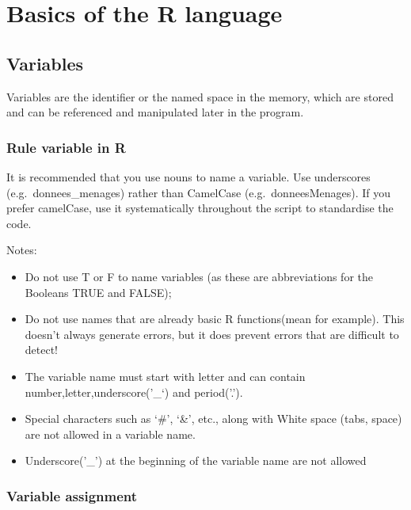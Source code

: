 \documentclass[
]{book}
\providecommand{\tightlist}{%
  \setlength{\itemsep}{0pt}\setlength{\parskip}{0pt}}
\begin{document}
\hypertarget{basics-of-the-r-language}{%
\chapter{Basics of the R language}\label{basics-of-the-r-language}}

\hypertarget{variables}{%
\section{Variables}\label{variables}}

Variables are the identifier or the named space in the memory, which are stored and can be referenced and manipulated later in the program.

\hypertarget{rule-variable-in-r}{%
\subsection*{Rule variable in R}\label{rule-variable-in-r}}

It is recommended that you use nouns to name a variable. Use underscores (e.g.~donnees\_menages) rather than CamelCase (e.g.~donneesMenages). If you prefer camelCase, use it systematically throughout the script to standardise the code.

Notes:

\begin{itemize}
\tightlist
\item
  Do not use T or F to name variables (as these are abbreviations for the Booleans TRUE and FALSE);
\item
  Do not use names that are already basic R functions(mean for example). This doesn't always generate errors, but it does prevent errors that are difficult to detect!
\item
  The variable name must start with letter and can contain number,letter,underscore('\_`) and period('.').
\item
  Special characters such as `\#', `\&', etc., along with White space (tabs, space) are not allowed in a variable name.
\item
  Underscore('\_') at the beginning of the variable name are not allowed
\end{itemize}

\hypertarget{variable-assignment}{%
\subsection*{Variable assignment}\label{variable-assignment}}
\end{document}
